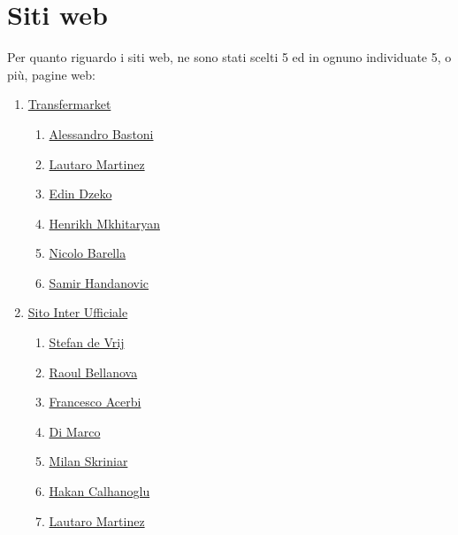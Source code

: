 \section{Siti web}
Per quanto riguardo i siti web, ne sono stati scelti 5 ed in ognuno individuate 5, o più, pagine web:
\begin{enumerate}
\setlength\itemsep{0.1em}
    \item \href{https://www.transfermarkt.it/inter-mailand/startseite/verein/46/saison_id/2022}{Transfermarket}\label{it:transfermarket}
    \begin{enumerate}
        \item \href{https://www.transfermarkt.it/alessandro-bastoni/profil/spieler/315853}{Alessandro Bastoni}
        \item \href{https://www.transfermarkt.it/lautaro-martinez/profil/spieler/406625}{Lautaro Martinez}
        \item \href{https://www.transfermarkt.it/edin-dzeko/profil/spieler/28396}{Edin Dzeko}
        \item \href{https://www.transfermarkt.it/henrikh-mkhitaryan/profil/spieler/55735}{Henrikh Mkhitaryan}
        \item  \href{https://www.transfermarkt.it/nicolo-barella/profil/spieler/255942}{Nicolo Barella}
        \item \href{https://www.transfermarkt.it/samir-handanovic/profil/spieler/28021}{Samir Handanovic}
    \end{enumerate}
    \item \href{https://www.inter.it/it/teams/prima-squadra?role=tutti}{Sito Inter Ufficiale}
    \begin{enumerate}
        \item \href{https://www.inter.it/it/squadra/prima-squadra/stefan-de-vrij}{Stefan de Vrij}
        \item \href{https://www.inter.it/it/squadra/prima-squadra/raoul-bellanova}{Raoul Bellanova}
        \item \href{https://www.inter.it/it/squadra/prima-squadra/francesco-acerbi}{Francesco Acerbi}
        \item \href{https://www.inter.it/it/squadra/prima-squadra/dimarco}{Di Marco}
        \item  \href{https://www.inter.it/it/squadra/prima-squadra/milan-skriniar}{Milan Skriniar}
        \item \href{https://www.inter.it/it/squadra/prima-squadra/hakan-calhanoglu}{Hakan Calhanoglu}
        \item \href{https://www.inter.it/it/squadra/prima-squadra/lautaro-martinez}{Lautaro Martinez}

\end{enumerate}
\end{enumerate}
